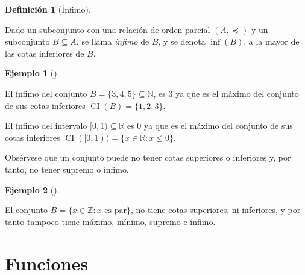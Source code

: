 \documentclass[
  a4paper,
]{scrreport}
\theoremstyle{definition}
\newtheorem{example}{Ejemplo}[chapter]
\theoremstyle{plain}
\theoremstyle{definition}
\newtheorem{definition}{Definición}[chapter]
\theoremstyle{definition}
\theoremstyle{plain}
\theoremstyle{plain}
\theoremstyle{remark}
\begin{document}
\begin{definition}[Ínfimo]\protect\hypertarget{def-infimo-conjunto}{}\label{def-infimo-conjunto}

Dado un subconjunto con una relación de orden parcial \((A,\preceq)\) y
un subconjunto \(B\subseteq A\), se llama \emph{ínfimo} de \(B\), y se
denota \(\inf(B)\), a la mayor de las cotas inferiores de \(B\).

\end{definition}

\begin{example}[]\protect\hypertarget{exm-infimo}{}\label{exm-infimo}

El ínfimo del conjunto \(B=\{3, 4, 5\}\subseteq \mathbb{N}\), es \(3\)
ya que es el máximo del conjunto de sus cotas inferiores
\(\operatorname{CI}(B)=\{1, 2, 3\}\).

El ínfimo del intervalo \([0,1)\subseteq \mathbb{R}\) es \(0\) ya que es
el máximo del conjunto de sus cotas inferiores
\(\operatorname{CI}([0,1)) = \{x\in \mathbb{R}:x\leq 0\}\).

\end{example}

\begin{tcolorbox}[enhanced jigsaw, leftrule=.75mm, colbacktitle=quarto-callout-warning-color!10!white, toprule=.15mm, opacityback=0, opacitybacktitle=0.6, toptitle=1mm, breakable, bottomtitle=1mm, colframe=quarto-callout-warning-color-frame, rightrule=.15mm, titlerule=0mm, title=\textcolor{quarto-callout-warning-color}{\faExclamationTriangle}\hspace{0.5em}{Advertencia}, arc=.35mm, left=2mm, bottomrule=.15mm, colback=white, coltitle=black]

Obsérvese que un conjunto puede no tener cotas superiores o inferiores
y, por tanto, no tener supremo o ínfimo.

\end{tcolorbox}

\begin{example}[]\protect\hypertarget{exm-no-supremo-infimio}{}\label{exm-no-supremo-infimio}

El conjunto \(B=\{x\in\mathbb{Z}: x \mbox{ es par}\}\), no tiene cotas
superiores, ni inferiores, y por tanto tampoco tiene máximo, mínimo,
supremo e ínfimo.

\end{example}

\section{Funciones}\label{funciones}
\end{document}
